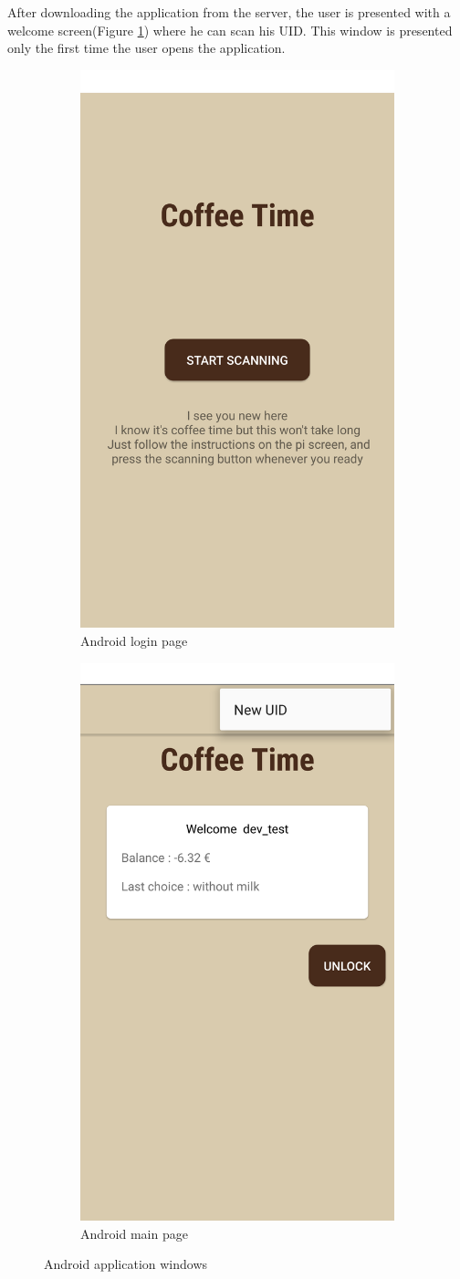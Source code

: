\documentclass[12pt]{article}
\begin{document}
   After downloading the application from the server, the user is presented with a welcome screen(Figure \ref{fig:android-login-page}) where he can scan his UID.
   This window is presented only the first time the user opens the application.\\
   \begin{figure}[H]
    \centering
    \begin{subfigure}{.5\textwidth}
      \centering
      \includegraphics[width=.4\linewidth]{./images/android-login}
      \caption{Android login page}
      \label{fig:android-login-page}
    \end{subfigure}%
    \begin{subfigure}{.5\textwidth}
      \centering
      \includegraphics[width=.4\linewidth]{./images/android-main}
      \caption{Android main page}
      \label{fig:android-main-page}
    \end{subfigure}
    \caption{Android application windows}
    \label{fig:android-windows}
   \end{figure}
   
\end{document}
